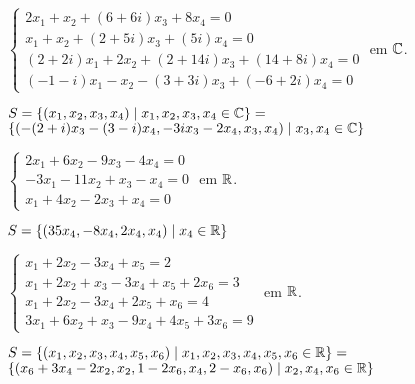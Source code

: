 \documentclass[12pt]{exam}
\begin{document}
\begin{exercicio}
    $
        \begin{cases}
            2x_1 + x_2 + (6 + 6i)x_3 + 8x_4 = 0\\
            x_1 + x_2 + (2 + 5i)x_3 + (5  i)x_4 = 0\\
            (2 + 2i)x_1 + 2x_2 + (2 + 14i)x_3 + (14 + 8i)x_4 =0\\
            (-1 - i)x_1 - x_2 - (3 + 3i)x_3 + (-6 + 2i)x_4 = 0
        \end{cases}
    $
    em $\mathbb{C}$.
    \begin{solucao}
        $S = \{(x_1, x_2, x_3, x_4) \mid x_1, x_2, x_3, x_4 \in \mathbb{C}\} = $\\ $\{(-(2 + i)x_3 - (3 - i)x_4,-3ix_3 - 2x_4, x_3, x_4) \mid x_3, x_4 \in \mathbb{C}\}$
    \end{solucao}
\end{exercicio}

\begin{exercicio}
    $
        \begin{cases}
            2x_1 + 6x_2 - 9x_3 - 4x_4 = 0\\
            -3x_1 - 11x_2 + x_3 - x_4 = 0\\
            x_1 + 4x_2 - 2x_3 + x_4 = 0
        \end{cases}
    $
    em $\mathbb{R}$.
    \begin{solucao}
        $S = \{(35x_4, -8x_4, 2x_4, x_4) \mid x_4 \in \mathbb{R}\}$
    \end{solucao}
\end{exercicio}

\begin{exercicio}
    $
        \begin{cases}
            x_1 + 2x_2 - 3x_4 + x_5 = 2\\
            x_1 + 2x_2 + x_3 - 3x_4 + x_5 + 2x_6 = 3\\
            x_1 + 2x_2 - 3x_4 + 2x_5 + x_6 = 4\\
            3x_1 + 6x_2 + x_3 - 9x_4 + 4x_5 + 3x_6 = 9
        \end{cases}
    $
    em $\mathbb{R}$.
    \begin{solucao}
        $S = \{(x_1, x_2, x_3, x_4, x_5, x_6) \mid x_1, x_2, x_3, x_4, x_5, x_6 \in \mathbb{R}\} = $\\ $\{(x_6 + 3x_4 - 2x_2, x_2, 1 - 2x_6, x_4, 2 - x_6, x_6) \mid x_2, x_4, x_6 \in \mathbb{R}\}$
    \end{solucao}
\end{exercicio}
\end{document}
